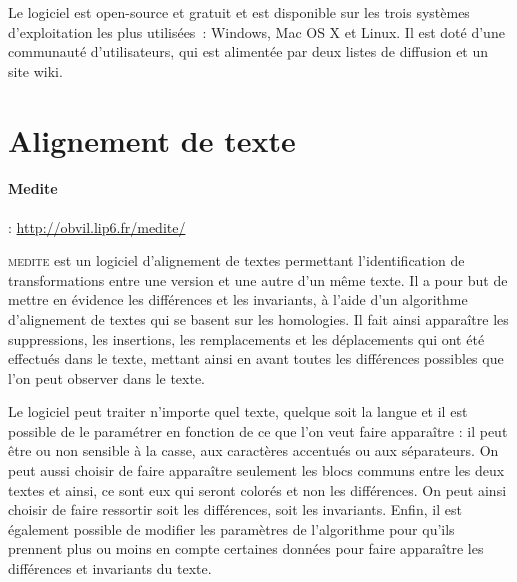 Le logiciel est open-source et gratuit et est disponible sur les trois systèmes d'exploitation les plus utilisées~: Windows, Mac OS X et Linux. Il est doté d'une communauté d'utilisateurs, qui est alimentée par deux listes de diffusion et un site wiki.

\section{Alignement de texte}
\paragraph{Medite}: \url{http://obvil.lip6.fr/medite/}

\textsc{medite} est un logiciel d'alignement de textes permettant l'identification de transformations entre une version et une autre d'un même texte. Il a pour but de mettre en évidence les différences et les invariants, à l'aide d'un algorithme d'alignement de textes qui se basent sur les homologies. Il fait ainsi apparaître les suppressions, les insertions, les remplacements et les déplacements qui ont été effectués dans le texte, mettant ainsi en avant toutes les différences possibles que l'on peut observer dans le texte.

Le logiciel peut traiter n'importe quel texte, quelque soit la langue et il est possible de le paramétrer en fonction de ce que l'on veut faire apparaître : il peut être ou non sensible à la casse, aux caractères accentués ou aux séparateurs. On peut aussi choisir de faire apparaître seulement les blocs communs entre les deux textes et ainsi, ce sont eux qui seront colorés et non les différences. On peut ainsi choisir de faire ressortir soit les différences, soit les invariants. Enfin, il est également possible de modifier les paramètres de l'algorithme pour qu'ils prennent plus ou moins en compte certaines données pour faire apparaître les différences et invariants du texte.